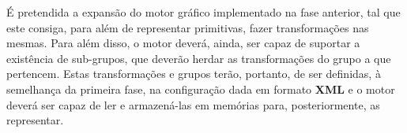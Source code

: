 \noindent
É pretendida a expansão do motor gráfico implementado na
fase anterior, tal que este consiga, para além de
representar primitivas, fazer transformações nas mesmas.
\newline
\break
\noindent
Para além disso, o motor deverá, ainda, ser capaz de
suportar a existência de sub-grupos, que deverão herdar as
transformações do grupo a que pertencem.
\newline
\break
\noindent
Estas transformações e grupos terão, portanto, de ser
definidas, à semelhança da primeira fase, na configuração
dada em formato \textbf{XML} e o motor deverá ser capaz
de ler e armazená-las em memórias para,
posteriormente, as representar.

